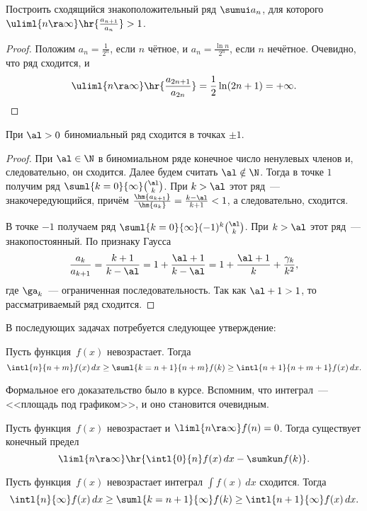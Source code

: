\documentclass[a4paper]{article}
\begin{document}
\begin{problem}
Построить сходящийся знакоположительный ряд
$\sumui a_n$, для которого $\uliml{n \ra \infty} \hr{\frac{a_{n+1}}{a_n}} > 1$.
\end{problem}

\begin{proof}
Положим $a_{n} = \frac{1}{2^n}$, если $n$ чётное, и $a_{n} = \frac{\ln n}{2^n}$, если $n$ нечётное. Очевидно, что
ряд сходится, и
$$
  \uliml{n \ra \infty} \hr{\frac{a_{2n+1}}{a_{2n}}} = \frac{1}{2}\ln (2n+1)= +\infty.
$$
\hfill\end{proof}

\begin{problem}
При $\al > 0$ биномиальный ряд сходится в точках $\pm 1$.
\end{problem}

\begin{proof}
При $\al \in \N$ в биномиальном ряде конечное число ненулевых членов и, следовательно, он сходится. Далее
будем считать $\al\notin \N$. Тогда в точке $1$ получим ряд $\suml{k=0}{\infty}\binom{\al}k$. При $k>\al$ этот ряд~---
знакочередующийся, причём $\frac{\hm{a_{k+1}}}{\hm{a_k}}=\frac{k-\al}{k+1}<1$, а следовательно, сходится.

В точке $-1$ получаем ряд $\suml{k=0}{\infty}(-1)^k\binom{\al}k$. При $k>\al$ этот
ряд~--- знакопостоянный. По признаку Гаусса
$$\frac{a_k}{a_{k+1}}=\frac{k+1}{k-\al}=1+\frac{\al+1}{k-\al}=1+\frac{\al+1}k+\frac{\gamma_k}{k^2},$$
где $\ga_k$~--- ограниченная последовательность. Так как $\al+1>1$, то рассматриваемый ряд сходится.
\end{proof}

В последующих задачах потребуется следующее утверждение:
\begin{stm}\label{stat}
Пусть функция~$f(x)$ невозрастает.
Тогда $$\intl{n}{n+m} f(x)\,dx \ge \suml{k=n+1}{n+m}f(k)\ge \intl{n+1}{n+m+1} f(x)\,dx.$$
\end{stm}

Формальное его доказательство было в курсе. Вспомним, что интеграл~--- <<площадь под графиком>>, и оно становится очевидным.

\begin{imp}\label{a}
Пусть функция~$f(x)$ невозрастает и $\liml{n \ra \infty}f(n)=0$.  Тогда существует конечный предел
$$\liml{n\ra\infty}\hr{\intl{0}{n}f(x)\,dx-\sumkun f(k)}.$$
\end{imp}

\begin{imp}\label{b}
Пусть функция~$f(x)$ невозрастает интеграл $\int f(x)\,dx$ сходится. Тогда
$$\intl{n}{\infty} f(x)\,dx \ge \suml{k=n+1}{\infty}f(k)\ge \intl{n+1}{\infty} f(x)\,dx.$$
\end{imp}
\end{document}
